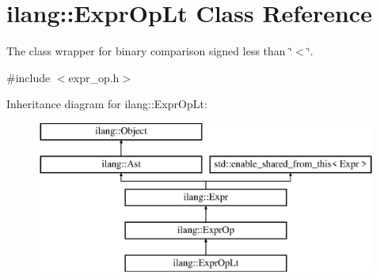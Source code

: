 \hypertarget{classilang_1_1_expr_op_lt}{}\section{ilang\+:\+:Expr\+Op\+Lt Class Reference}
\label{classilang_1_1_expr_op_lt}


The class wrapper for binary comparison signed less than \char`\"{}$<$\char`\"{}.  




{\ttfamily \#include $<$expr\+\_\+op.\+h$>$}

Inheritance diagram for ilang\+:\+:Expr\+Op\+Lt\+:\begin{figure}[H]
\begin{center}
\leavevmode
\includegraphics[height=5.000000cm]{classilang_1_1_expr_op_lt}
\end{center}
\end{figure}
